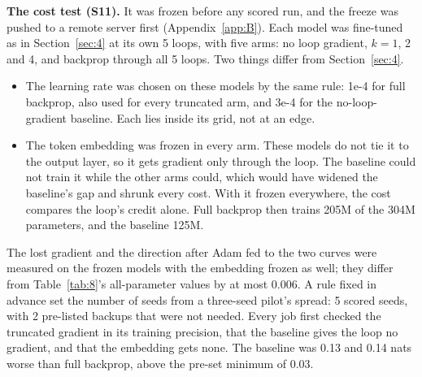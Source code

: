 \documentclass[10pt]{article}
\begin{document}
\textbf{The cost test (S11).} It was frozen before any scored run, and the freeze was pushed to a remote server first (Appendix~\ref{app:B}). Each model was fine-tuned as in Section~\ref{sec:4} at its own 5 loops, with five arms: no loop gradient, $k = 1$, 2 and 4, and backprop through all 5 loops. Two things differ from Section~\ref{sec:4}.

\begin{itemize}
\item The learning rate was chosen on these models by the same rule: 1e-4 for full backprop, also used for every truncated arm, and 3e-4 for the no-loop-gradient baseline. Each lies inside its grid, not at an edge.
\item The token embedding was frozen in every arm. These models do not tie it to the output layer, so it gets gradient only through the loop. The baseline could not train it while the other arms could, which would have widened the baseline's gap and shrunk every cost. With it frozen everywhere, the cost compares the loop's credit alone. Full backprop then trains 205M of the 304M parameters, and the baseline 125M.
\end{itemize}

The lost gradient and the direction after Adam fed to the two curves were measured on the frozen models with the embedding frozen as well; they differ from Table~\ref{tab:8}'s all-parameter values by at most 0.006. A rule fixed in advance set the number of seeds from a three-seed pilot's spread: 5 scored seeds, with 2 pre-listed backups that were not needed. Every job first checked the truncated gradient in its training precision, that the baseline gives the loop no gradient, and that the embedding gets none. The baseline was 0.13 and 0.14 nats worse than full backprop, above the pre-set minimum of 0.03.
\end{document}
